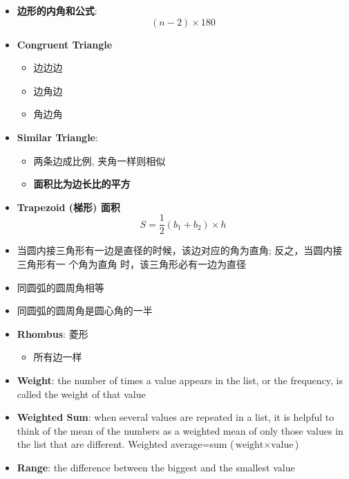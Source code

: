 \begin{multicols}{2}
\begin{itemize}
    \item \textbf{边形的内角和公式}:
    \begin{equation}
      \left( n - 2 \right) \times 180
    \end{equation}

    \item \textbf{Congruent Triangle}
    \begin{itemize}
      \item 边边边
      \item 边角边
      \item 角边角
    \end{itemize}

    \item \textbf{Similar Triangle}:
    \begin{itemize}
      \item 两条边成比例, 夹角一样则相似
      \item \textbf{面积比为边长比的平方}
    \end{itemize}

    \item \textbf{Trapezoid (梯形) 面积}
    \begin{equation}
      S = \frac{1}{2}\left( b_{1} + b_{2} \right) \times h
    \end{equation}

    \item 当圆内接三角形有一边是直径的时候，该边对应的角为直角; 反之，当圆内接三角形有一
    个角为直角 时，该三角形必有一边为直径
    \item 同圆弧的圆周角相等
    \item 同圆弧的圆周角是圆心角的一半
    \item \textbf{Rhombus}: 菱形
    \begin{itemize}
      \item 所有边一样
    \end{itemize}

    \item \textbf{Weight}: the number of times a value appears in the list,
    or the frequency, is called the weight of that value

    \item \textbf{Weighted Sum}: when several values are repeated in a list,
    it is helpful to think of the mean of the numbers as a weighted mean of
    only those values in the list that are different. Weighted average=sum
    ($ \text{weight} \times \text{value} $)

    \item \textbf{Range}: the difference between the biggest and the smallest
    value


\end{itemize}
\end{multicols}
